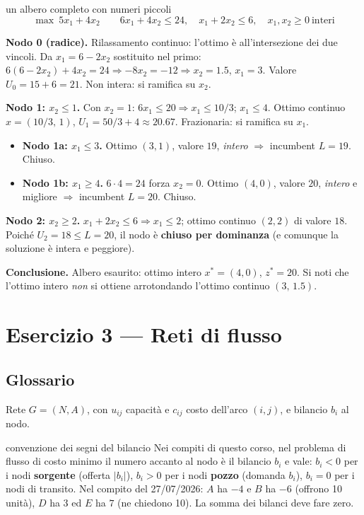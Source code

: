 \documentclass[11pt,a4paper]{article}
\begin{document}
\begin{es}{un albero completo con numeri piccoli}
\[ \max\ 5x_1 + 4x_2 \qquad 6x_1 + 4x_2 \le 24, \quad x_1 + 2x_2 \le 6, \quad x_1,x_2 \ge 0 \ \text{interi} \]

\textbf{Nodo 0 (radice).} Rilassamento continuo: l'ottimo è all'intersezione dei due vincoli.
Da $x_1 = 6-2x_2$ sostituito nel primo: $6(6-2x_2)+4x_2 = 24 \Rightarrow -8x_2 = -12 \Rightarrow x_2 = 1.5$,
$x_1 = 3$. Valore $U_0 = 15 + 6 = 21$. Non intera: si ramifica su $x_2$.

\textbf{Nodo 1: $x_2 \le 1$.} Con $x_2=1$: $6x_1 \le 20 \Rightarrow x_1 \le 10/3$;
$x_1 \le 4$. Ottimo continuo $x = (10/3,\,1)$, $U_1 = 50/3 + 4 \approx 20.67$. Frazionaria: si ramifica su $x_1$.
\begin{itemize}
\item \textbf{Nodo 1a: $x_1 \le 3$.} Ottimo $(3,1)$, valore $19$, \emph{intero} $\Rightarrow$
      incumbent $L = 19$. Chiuso.
\item \textbf{Nodo 1b: $x_1 \ge 4$.} $6\cdot 4 = 24$ forza $x_2 = 0$. Ottimo $(4,0)$, valore $20$,
      \emph{intero} e migliore $\Rightarrow$ incumbent $L = 20$. Chiuso.
\end{itemize}

\textbf{Nodo 2: $x_2 \ge 2$.} $x_1 + 2x_2 \le 6 \Rightarrow x_1 \le 2$;
ottimo continuo $(2,2)$ di valore $18$. Poiché $U_2 = 18 \le L = 20$, il nodo è
\textbf{chiuso per dominanza} (e comunque la soluzione è intera e peggiore).

\textbf{Conclusione.} Albero esaurito: ottimo intero $x^* = (4,0)$, $z^* = 20$.
Si noti che l'ottimo intero \emph{non} si ottiene arrotondando l'ottimo continuo $(3,\,1.5)$.
\end{es}

\newpage
\section{Esercizio 3 --- Reti di flusso}

\subsection{Glossario}

Rete $G = (N, A)$, con $u_{ij}$ capacità e $c_{ij}$ costo dell'arco $(i,j)$,
e bilancio $b_i$ al nodo.

\begin{att}{convenzione dei segni del bilancio}
Nei compiti di questo corso, nel problema di flusso di costo minimo il numero accanto al nodo è
il bilancio $b_i$ e vale: $b_i < 0$ per i nodi \textbf{sorgente} (offerta $|b_i|$),
$b_i > 0$ per i nodi \textbf{pozzo} (domanda $b_i$), $b_i = 0$ per i nodi di transito.
Nel compito del 27/07/2026: $A$ ha $-4$ e $B$ ha $-6$ (offrono 10 unità),
$D$ ha $3$ ed $E$ ha $7$ (ne chiedono 10). La somma dei bilanci deve fare zero.
\end{att}
\end{document}
